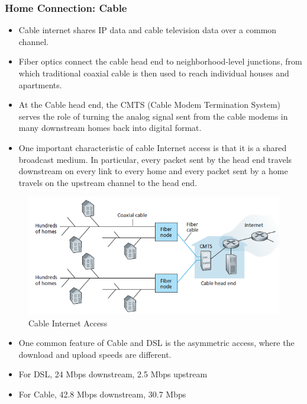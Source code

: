 \documentclass{article}
\theoremstyle{plain}
\theoremstyle{definition}
\begin{document}
\subsubsection{Home Connection: Cable}
\begin{itemize}
    \item Cable internet shares IP data and cable television data over a common channel. 
    
    \item Fiber optics connect the cable head end to neighborhood-level junctions, from which traditional coaxial cable is then used to reach individual houses and apartments.
    
    \item At the Cable head end, the CMTS (Cable Modem Termination System) serves the role of turning the analog signal sent from the cable modems in many downstream homes back into digital format.
    
    \item One important characteristic of cable Internet access is that it is a shared broadcast medium. In particular, every packet sent by the head end travels downstream on every link to every home and every packet sent by a home travels on the upstream channel to the head end.
\end{itemize}

\begin{figure}[h]
        \centering
        \includegraphics{cn4.png}
        \caption{Cable Internet Access}
        \label{fig:my_label_4}
    \end{figure}

\begin{itemize}
    \item One common feature of Cable and DSL is the asymmetric access, where the download and upload speeds are different.
    
    \item For DSL, 24 Mbps downstream, 2.5 Mbps upstream
    
    \item For Cable, 42.8 Mbps downstream, 30.7 Mbps
\end{itemize}
\end{document}
